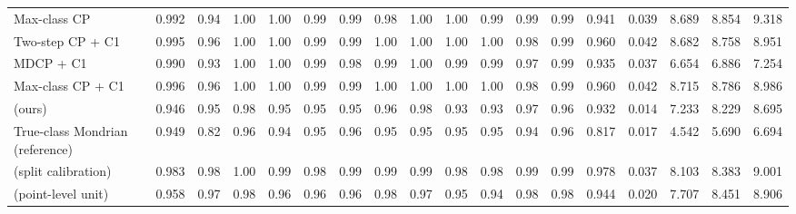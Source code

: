 \begin{table}[!htbp]
{\begin{tabular}{lccccccccccccccccc}
Max-class CP & 0.992 & 0.94 & 1.00 & 1.00 & 0.99 & 0.99 & 0.98 & 1.00 & 1.00 & 0.99 & 0.99 & 0.99 & 0.941 & 0.039 & 8.689 & 8.854 & 9.318 \\
Two-step CP + C1 & 0.995 & 0.96 & 1.00 & 1.00 & 0.99 & 0.99 & 1.00 & 1.00 & 1.00 & 1.00 & 0.98 & 0.99 & 0.960 & 0.042 & 8.682 & 8.758 & 8.951 \\
MDCP + C1 & 0.990 & 0.93 & 1.00 & 1.00 & 0.99 & 0.98 & 0.99 & 1.00 & 0.99 & 0.99 & 0.97 & 0.99 & 0.935 & 0.037 & 6.654 & 6.886 & 7.254 \\
Max-class CP + C1 & 0.996 & 0.96 & 1.00 & 1.00 & 0.99 & 0.99 & 1.00 & 1.00 & 1.00 & 1.00 & 0.98 & 0.99 & 0.960 & 0.042 & 8.715 & 8.786 & 8.986 \\
\gamut{} (ours) & 0.946 & 0.95 & 0.98 & 0.95 & 0.95 & 0.95 & 0.96 & 0.98 & 0.93 & 0.93 & 0.97 & 0.96 & 0.932 & 0.014 & 7.233 & 8.229 & 8.695 \\
True-class Mondrian (reference) & 0.949 & 0.82 & 0.96 & 0.94 & 0.95 & 0.96 & 0.95 & 0.95 & 0.95 & 0.95 & 0.94 & 0.96 & 0.817 & 0.017 & 4.542 & 5.690 & 6.694 \\
\gamut{} (split calibration) & 0.983 & 0.98 & 1.00 & 0.99 & 0.98 & 0.99 & 0.99 & 0.99 & 0.98 & 0.98 & 0.99 & 0.99 & 0.978 & 0.037 & 8.103 & 8.383 & 9.001 \\
\gamut{} (point-level unit) & 0.958 & 0.97 & 0.98 & 0.96 & 0.96 & 0.96 & 0.98 & 0.97 & 0.95 & 0.94 & 0.98 & 0.98 & 0.944 & 0.020 & 7.707 & 8.451 & 8.906 \\
\bottomrule
\end{tabular}}
\end{table}
\FloatBarrier

